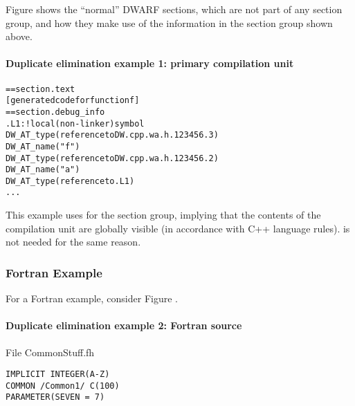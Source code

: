 Figure 
shows the ``normal'' DWARF sections, which are not part of
any section group, and how they make use of the information
in the section group shown above.

\paragraph{Duplicate elimination example 1: primary compilation unit} 
\label{app:duplicateeliminationexample1primarycompilationunit}
\begin{alltt}
== section .text
    [generated code for function f]
== section .debug\_info
.L1:                   ! local (non-linker) symbol
            DW\_AT\_type(reference to DW.cpp.wa.h.123456.3)
            DW\_AT\_name("f")
            DW\_AT\_type(reference to DW.cpp.wa.h.123456.2)
                DW\_AT\_name("a")
                DW\_AT\_type(reference to .L1)
        ...
\end{alltt}

This example uses  for the section group,
implying that the contents of the compilation unit are
globally visible (in accordance with C++ language rules).
 is not needed for the same reason.

\subsubsection{Fortran Example}


For a Fortran example, consider 
Figure .


\paragraph{Duplicate elimination example 2: Fortran source} 
\label{app:duplicateeliminationexample2fortransource}

File CommonStuff.fh

\begin{lstlisting}
IMPLICIT INTEGER(A-Z)
COMMON /Common1/ C(100)
PARAMETER(SEVEN = 7)
\end{lstlisting}

